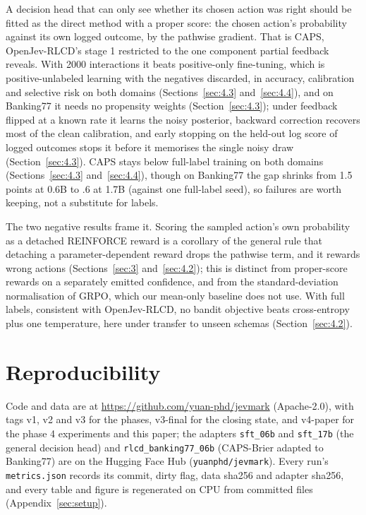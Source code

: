 \documentclass[10pt,letterpaper]{article}
\theoremstyle{plain}
\begin{document}
A decision head that can only see whether its chosen action was right should be fitted as the direct method with a proper score: the chosen action's probability against its own logged outcome, by the pathwise gradient. That is CAPS, OpenJev-RLCD's stage 1 restricted to the one component partial feedback reveals. With 2000 interactions it beats positive-only fine-tuning, which is positive-unlabeled learning with the negatives discarded, in accuracy, calibration and selective risk on both domains (Sections~\ref{sec:4.3} and~\ref{sec:4.4}), and on Banking77 it needs no propensity weights (Section~\ref{sec:4.3}); under feedback flipped at a known rate it learns the noisy posterior, backward correction recovers most of the clean calibration, and early stopping on the held-out log score of logged outcomes stops it before it memorises the single noisy draw (Section~\ref{sec:4.3}). CAPS stays below full-label training on both domains (Sections~\ref{sec:4.3} and~\ref{sec:4.4}), though on Banking77 the gap shrinks from 1.5 points at 0.6B to .6 at 1.7B (against one full-label seed), so failures are worth keeping, not a substitute for labels.

The two negative results frame it. Scoring the sampled action's own probability as a detached REINFORCE reward is a corollary of the general rule that detaching a parameter-dependent reward drops the pathwise term, and it rewards wrong actions (Sections~\ref{sec:3} and~\ref{sec:4.2}); this is distinct from proper-score rewards on a separately emitted confidence, and from the standard-deviation normalisation of GRPO, which our mean-only baseline does not use. With full labels, consistent with OpenJev-RLCD, no bandit objective beats cross-entropy plus one temperature, here under transfer to unseen schemas (Section~\ref{sec:4.2}).

\section{Reproducibility}\label{sec:7}

Code and data are at \url{https://github.com/yuan-phd/jevmark} (Apache-2.0), with tags v1, v2 and v3 for the phases, v3-final for the closing state, and v4-paper for the phase 4 experiments and this paper; the adapters \texttt{sft\_06b} and \texttt{sft\_17b} (the general decision head) and \texttt{rlcd\_banking77\_06b} (CAPS-Brier adapted to Banking77) are on the Hugging Face Hub (\texttt{yuanphd/jevmark}). Every run's \texttt{metrics.json} records its commit, dirty flag, data sha256 and adapter sha256, and every table and figure is regenerated on CPU from committed files (Appendix~\ref{sec:setup}).
\end{document}
